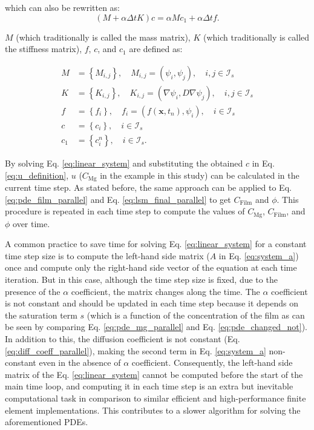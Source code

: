 \noindent which can also be rewritten as:
\begin{equation} \label{eq:linear_eq_simple}
(M+\alpha \Delta t K) c=\alpha M c_{1}+\alpha \Delta t f.
\end{equation}

$M$ (which traditionally is called the mass matrix), $K$ (which traditionally is called the stiffness matrix), $f$, $c$, and $c_1$ are defined as:

\begin{equation} \label{eq:matrices_defintion}
\begin{aligned} M &=\left\{M_{i, j}\right\}, \quad M_{i, j}=\left(\psi_{i}, \psi_{j}\right), \quad i, j \in \mathcal{I}_{s} \\ K &=\left\{K_{i, j}\right\}, \quad K_{i, j}=\left(\nabla \psi_{i}, D \nabla \psi_{j}\right), \quad i, j \in \mathcal{I}_{s} \\ f &=\left\{f_{i}\right\}, \quad f_{i}=\left(f\left(\boldsymbol{x}, t_{n}\right), \psi_{i}\right), \quad i \in \mathcal{I}_{s} \\ c &=\left\{c_{i}\right\}, \quad i \in \mathcal{I}_{s} \\ c_{1} &=\left\{c_{i}^{n}\right\}, \quad i \in \mathcal{I}_{s}. \end{aligned}
\end{equation}

By solving Eq. \ref{eq:linear_system} and substituting the obtained $c$ in Eq. \ref{eq:u_definition}, $u$ ($C_{\mathrm{Mg}}$ in the example in this study) can be calculated in the current time step. As stated before, the same approach can be applied to Eq. \ref{eq:pde_film_parallel} and Eq. \ref{eq:lsm_final_parallel} to get $C_{\mathrm{Film}}$ and $\phi$. This procedure is repeated in each time step to compute the values of $C_{\mathrm{Mg}}$, $C_{\mathrm{Film}}$, and $\phi$ over time.

A common practice to save time for solving Eq. \ref{eq:linear_system}  for a constant time step size is to compute the left-hand side matrix ($A$ in Eq. \ref{eq:system_a}) once and compute only the right-hand side vector of the equation at each time iteration. But in this case, although the time step size is fixed, due to the presence of the $\alpha$ coefficient, the matrix changes along the time. The $\alpha$ coefficient is not constant and should be updated in each time step because it depends on the saturation term $s$ (which is a function of the concentration of the film as can be seen by comparing Eq. \ref{eq:pde_mg_parallel} and Eq. \ref{eq:pde_changed_not}). In addition to this, the diffusion coefficient is not constant (Eq. \ref{eq:diff_coeff_parallel}), making the second term in Eq. \ref{eq:system_a} non-constant even in the absence of $\alpha$ coefficient. Consequently, the left-hand side matrix of the Eq. \ref{eq:linear_system} cannot be computed before the start of the main time loop, and computing it in each time step is an extra but inevitable computational task in comparison to similar efficient and high-performance finite element implementations. This contributes to a slower algorithm for solving the aforementioned {PDE}s.


